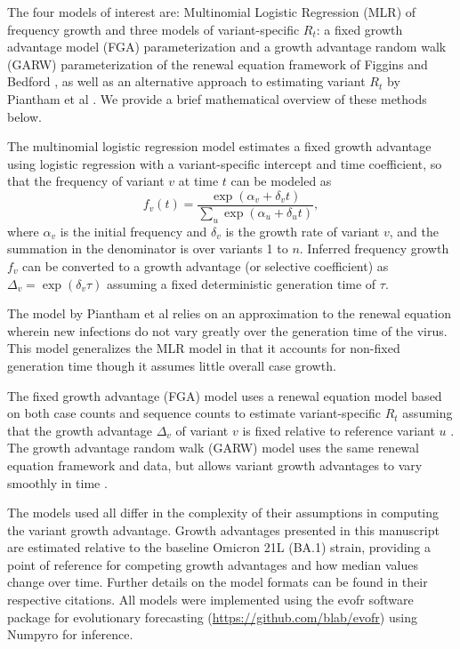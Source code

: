 \documentclass[11pt,oneside,letterpaper]{article}
\begin{document}
The four models of interest are: Multinomial Logistic Regression (MLR) of frequency growth and three models of variant-specific $R_t$: a fixed growth advantage model (FGA) parameterization and a growth advantage random walk (GARW) parameterization of the renewal equation framework of Figgins and Bedford \cite{figgins2022sars}, as well as an alternative approach to estimating variant $R_t$ by Piantham et al \cite{piantham2021estimating}.
We provide a brief mathematical overview of these methods below.

The multinomial logistic regression model estimates a fixed growth advantage using logistic regression with a variant-specific intercept and time coefficient, so that the frequency of variant $v$ at time $t$ can be modeled as
\begin{equation}
    f_{v}(t) = \frac{\exp(\alpha_{v} + \delta_{v} t)}{\sum_{u} \exp(\alpha_{u} + \delta_{u} t)},
\end{equation}
where $\alpha_v$ is the initial frequency and $\delta_v$ is the growth rate of variant $v$, and the summation in the denominator is over variants 1 to $n$.
Inferred frequency growth $f_v$ can be converted to a growth advantage (or selective coefficient) as $\Delta_{v} = \exp(\delta_{v} \tau)$ assuming a fixed deterministic  generation time of $\tau$.

The model by Piantham et al \cite{piantham2021estimating} relies on an approximation to the renewal equation wherein new infections do not vary greatly over the generation time of the virus.
This model generalizes the MLR model in that it accounts for non-fixed generation time though it assumes little overall case growth.

The fixed growth advantage (FGA) model uses a renewal equation model based on both case counts and sequence counts to estimate variant-specific $R_t$ assuming that the growth advantage $\Delta_{v}$ of variant $v$ is fixed relative to reference variant $u$ \cite{figgins2022sars}.
The growth advantage random walk (GARW) model uses the same renewal equation framework and data, but allows variant growth advantages to vary smoothly in time \cite{figgins2022sars}.

The models used all differ in the complexity of their assumptions in computing the variant growth advantage.
Growth advantages presented in this manuscript are estimated relative to the baseline Omicron 21L (BA.1) strain, providing a point of reference for competing growth advantages and how median values change over time.
Further details on the model formats can be found in their respective citations.
All models were implemented using the evofr software package for evolutionary forecasting (\href{https://github.com/blab/evofr}{https://github.com/blab/evofr}) using Numpyro for inference.
\end{document}
